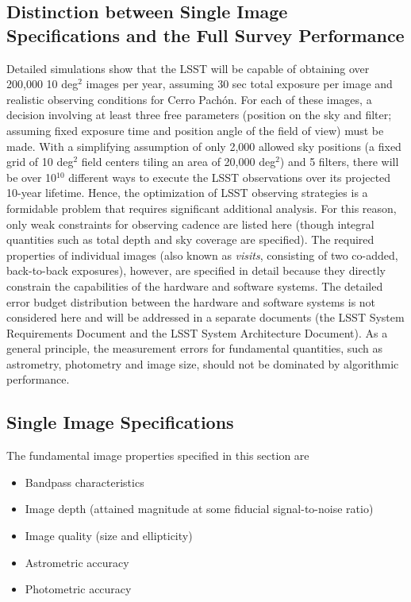 \subsection{Distinction between Single Image Specifications and the
                        Full Survey Performance \label{sec:defs}}


Detailed simulations show that the LSST will be capable of obtaining over
200,000 10 deg$^2$ images per year, assuming 30 sec total exposure per
image and realistic observing conditions for Cerro Pach\'{o}n. For each of
these images, a decision involving at least three free
parameters (position on the sky and filter; assuming fixed exposure time
and position angle of the field of view) must be made. With a
simplifying assumption of only 2,000 allowed sky positions (\ie a
fixed grid of 10 deg$^2$ field centers tiling an area of 20,000 deg$^2$)
and 5 filters, there will be over 10$^{10}$ different ways to execute the
LSST observations over its projected 10-year lifetime. Hence, the
optimization of LSST observing strategies is a formidable problem that
requires significant additional analysis. For this reason, only weak
constraints for observing cadence are listed here (though integral
quantities such as total depth and sky coverage are specified).
The required properties of individual images (also known as {\it
visits}, consisting of two co-added, back-to-back exposures), however,
are specified
in detail because they directly constrain the capabilities of the hardware
and software systems. The detailed error budget distribution between the hardware
and software systems is not considered here and will be addressed in a
separate documents (the LSST System Requirements Document and the LSST System
Architecture Document).
As a general principle, the measurement errors for fundamental quantities,
such as astrometry, photometry and image size, should not be dominated
by algorithmic performance.




\subsection{              Single Image Specifications              }
\label{singleImageSpecs}


The fundamental image properties specified in this section are
\begin{itemize}
\item Bandpass characteristics
\item Image depth (attained magnitude at some fiducial signal-to-noise ratio)
\item Image quality (size and ellipticity)
\item Astrometric accuracy
\item Photometric accuracy
\end{itemize}

